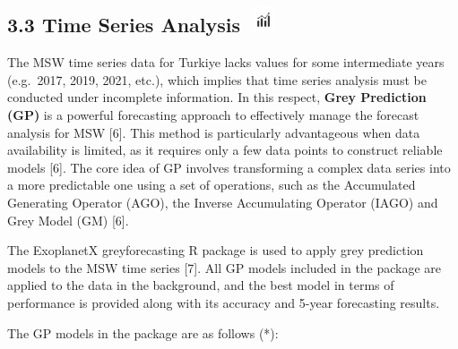 \documentclass[
  11pt,
  a4paper,
  DIV=11,
  numbers=noendperiod]{scrartcl}
\begin{document}
\subsection[{3.3 Time Series Analysis} ]{\texorpdfstring{{3.3 Time
Series Analysis}
\protect\includegraphics[width=0.375in,height=0.29167in]{assets/images/model.jpg}}{3.3 Time Series Analysis }}\label{time-series-analysis}

The MSW time series data for Turkiye lacks values for some intermediate
years (e.g.~2017, 2019, 2021, etc.), which implies that time series
analysis must be conducted under incomplete information. In this
respect, \textbf{Grey Prediction (GP)} is a powerful forecasting
approach to effectively manage the forecast analysis for MSW {[}6{]}.
This method is particularly advantageous when data availability is
limited, as it requires only a few data points to construct reliable
models {[}6{]}. The core idea of GP involves transforming a complex data
series into a more predictable one using a set of operations, such as
the Accumulated Generating Operator (AGO), the Inverse Accumulating
Operator (IAGO) and Grey Model (GM) {[}6{]}.

The ExoplanetX greyforecasting R package is used to apply grey
prediction models to the MSW time series {[}7{]}. All GP models included
in the package are applied to the data in the background, and the best
model in terms of performance is provided along with its accuracy and
5-year forecasting results.

The GP models in the package are as follows (*):
\end{document}
